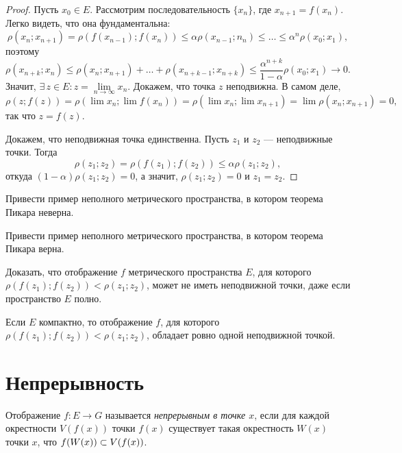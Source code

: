 \documentclass[10pt]{article}
\newcommand*{\p}[1]{#1\nobreak\discretionary{}{\hbox{$\mathsurround=0pt #1$}}{}}
\begin{document}
\begin{proof}
Пусть $x_0\in E$. Рассмотрим последовательность $\{x_n\}$, где
$x_{n+1}=f(x_n)$. Легко видеть, что она фундаментальна:
$$\rho(x_{n};x_{n+1})=\rho(f(x_{n-1});f(x_n))\leqslant\alpha\rho(x_{n-1};n_n)
\leqslant\ldots\leqslant\alpha^n\rho(x_0;x_1),$$ поэтому
$$\rho(x_{n+k};x_n)\leqslant\rho(x_n;x_{n+1})+\ldots+\rho(x_{n+k-1};x_{n+k})
\leqslant\frac{\alpha^{n+k}}{1-\alpha}\rho(x_0;x_1)\to 0.$$ Значит,
$\exists\,z\in E:z=\lim\limits_{n\to\infty} x_n$. Докажем, что точка
$z$ неподвижна. В самом деле, $$\rho(z;f(z))=\rho(\lim x_n;\lim
f(x_n))=\rho(\lim x_n;\lim x_{n+1})=\lim\rho(x_n;x_{n+1})=0,$$ так
что $z=f(z)$.

Докажем, что неподвижная точка единственна. Пусть $z_1$ и $z_2$ ---
неподвижные точки. Тогда
$$\rho(z_1;z_2)=\rho(f(z_1);f(z_2))\leqslant\alpha\rho(z_1;z_2),$$
откуда $(1-\alpha)\rho(z_1;z_2)=0$, а значит, $\rho(z_1;z_2)=0$ и
$z_1=z_2$.
\end{proof}

\begin{problem}
Привести пример неполного метрического пространства, в котором
теорема Пикара неверна.
\end{problem}

\begin{problem}
Привести пример неполного метрического пространства, в котором
теорема Пикара верна.
\end{problem}

\begin{problem}
Доказать, что отображение $f$ метрического пространства $E$, для
которого $\rho(f(z_1);f(z_2))<\rho(z_1;z_2)$, может не иметь
неподвижной точки, даже если пространство $E$ полно.
\end{problem}

\begin{problem}
Если $E$ компактно, то отображение $f$, для которого
$\rho(f(z_1);f(z_2))<\rho(z_1;z_2)$, обладает ровно одной
неподвижной точкой.
\end{problem}
\clearpage



\vspace{-20pt}

\section{Непрерывность}

\begin{df}
Отображение $f\colon E\to G$ называется \emph{непрерывным в точке
$x$}, если для каждой окрестности $V(f(x))$ точки $f(x)$ существует
такая окрестность $W(x)$ точки $x$, что $f(W(x))\p\subset V(f(x))$.
\end{df}
\end{document}
